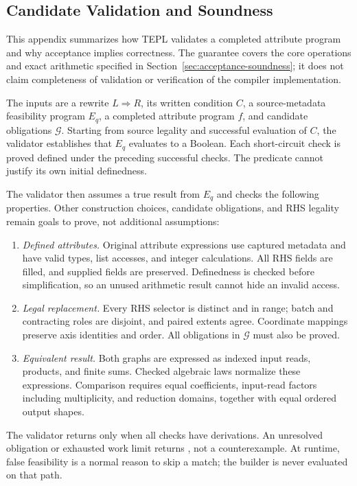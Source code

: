 \subsection{Candidate Validation and Soundness}
\label{app:validation-proofs}
This appendix summarizes how TEPL validates a completed attribute program
and why acceptance implies correctness. The guarantee covers the core
operations and exact arithmetic specified in
Section~\ref{sec:acceptance-soundness}; it does not claim
completeness of validation or verification of the compiler implementation.

\label{app:validation-procedure}
The inputs are a rewrite $L\Rightarrow R$, its written condition $C$, a
source-metadata feasibility program $E_q$, a completed attribute program
$f$, and candidate obligations $\mathcal G$. Starting from source legality
and successful evaluation of $C$, the validator establishes that $E_q$
evaluates to a Boolean. Each short-circuit check is proved defined under
the preceding successful checks. The predicate cannot justify its own
initial definedness.

The validator then assumes a true result from $E_q$ and checks the
following properties. Other construction choices, candidate obligations,
and RHS legality remain goals to prove, not additional assumptions:
\begin{enumerate}
\item \emph{Defined attributes.} Original attribute expressions use captured
metadata and have valid types, list accesses, and integer calculations.
All RHS fields are filled, and supplied fields are preserved. Definedness
is checked before simplification, so an unused arithmetic result cannot
hide an invalid access.
\item \emph{Legal replacement.} Every RHS selector is distinct and in range;
batch and contracting roles are disjoint, and paired extents agree.
Coordinate mappings preserve axis identities and order. All obligations
in $\mathcal G$ must also be proved.
\item \emph{Equivalent result.} Both graphs are expressed as indexed input
reads, products, and finite sums. Checked algebraic laws normalize these
expressions. Comparison requires equal coefficients, input-read factors
including multiplicity, and reduction domains, together with equal
ordered output shapes.
\end{enumerate}
The validator returns  only when all checks have derivations.
An unresolved obligation or exhausted work limit returns ,
not a counterexample. At runtime, false feasibility is a normal reason to
skip a match; the builder is never evaluated on that path.


